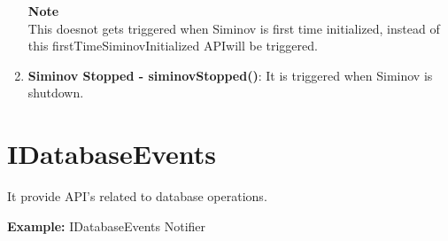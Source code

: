 \begin{enumerate}
\begin{center}
{{							\hfill \textbf{Note} \\
								This doesnot gets triggered when Siminov is first time initialized, instead of this firstTimeSiminovInitialized APIwill be triggered.

							\vspace*{0.0cm} %
						}
					}

					\end{center}

		
			\item \small \textbf{Siminov Stopped - siminovStopped()}: It is triggered when Siminov is shutdown.


		\end{enumerate}



\section{IDatabaseEvents} It provide API's related to database operations.


		\par
		\textbf{Example:} IDatabaseEvents Notifier
			


